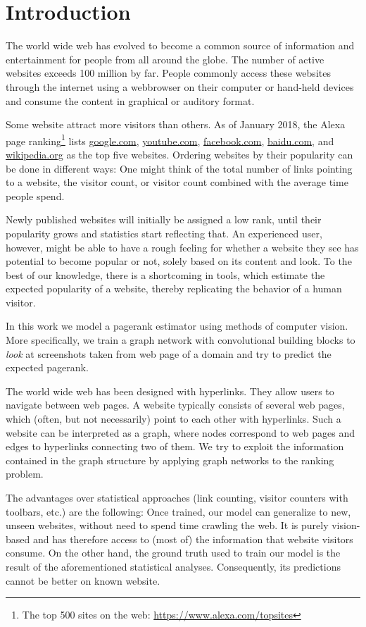 \section{Introduction}
\label{section:introduction}

The world wide web has evolved to become a common source of information and entertainment for people from all around the globe. The number of active websites exceeds 100 million by far. People commonly access these websites through the internet using a webbrowser on their computer or hand-held devices and consume the content in graphical or auditory format.

Some website attract more visitors than others. As of January 2018, the Alexa page ranking\footnote{The top 500 sites on the web: \url{https://www.alexa.com/topsites}} lists \url{google.com}, \url{youtube.com}, \url{facebook.com}, \url{baidu.com}, and \url{wikipedia.org} as the top five websites. Ordering websites by their popularity can be done in different ways: One might think of the total number of links pointing to a website, the visitor count, or visitor count combined with the average time people spend.

Newly published websites will initially be assigned a low rank, until their popularity grows and statistics start reflecting that. An experienced user, however, might be able to have a rough feeling for whether a website they see has potential to become popular or not, solely based on its content and look. To the best of our knowledge, there is a shortcoming in tools, which estimate the expected popularity of a website, thereby replicating the behavior of a human visitor.

In this work we model a pagerank estimator using methods of computer vision. More specifically, we train a graph network with convolutional building blocks to \textit{look} at screenshots taken from web page of a domain and try to predict the expected pagerank.

The world wide web has been designed with hyperlinks. They allow users to navigate between web pages. A website typically consists of several web pages, which (often, but not necessarily) point to each other with hyperlinks. Such a website can be interpreted as a graph, where nodes correspond to web pages and edges to hyperlinks connecting two of them. We try to exploit the information contained in the graph structure by applying graph networks to the ranking problem.

The advantages over statistical approaches (link counting, visitor counters with toolbars, etc.) are the following: Once trained, our model can generalize to new, unseen websites, without need to spend time crawling the web. It is purely vision-based and has therefore access to (most of) the information that website visitors consume. On the other hand, the ground truth used to train our model is the result of the aforementioned statistical analyses. Consequently, its  predictions cannot be better on known website.

